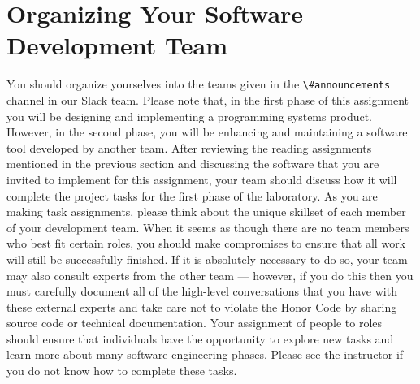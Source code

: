 \documentclass[11pt]{article}
\newcommand{\url}[1]{\lstinline{#1}}
\newcommand{\channel}[1]{\lstinline{#1}}
\begin{document}



\section*{Organizing Your Software Development Team}

You should organize yourselves into the teams given in the \channel{\#announcements} channel in our Slack team. Please
note that, in the first phase of this assignment you will be designing and implementing a programming systems product.
However, in the second phase, you will be enhancing and maintaining a software tool developed by another team. After
reviewing the reading assignments mentioned in the previous section and discussing the software that you are invited to
implement for this assignment, your team should discuss how it will complete the project tasks for the first phase of
the laboratory. As you are making task assignments, please think about the unique skillset of each member of your
development team. When it seems as though there are no team members who best fit certain roles, you should make
compromises to ensure that all work will still be successfully finished. If it is absolutely necessary to do so, your
team may also consult experts from the other team --- however, if you do this then you must carefully document all of
the high-level conversations that you have with these external experts and take care not to violate the Honor Code by
sharing source code or technical documentation. Your assignment of people to roles should ensure that individuals have
the opportunity to explore new tasks and learn more about many software engineering phases. Please see the instructor if
you do not know how to complete these tasks.
\end{document}

